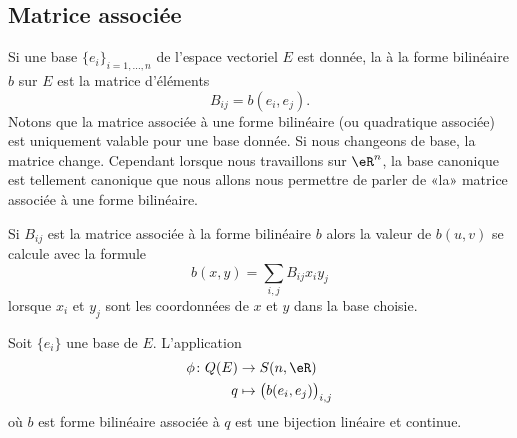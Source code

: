\subsection{Matrice associée}

Si une base \( \{ e_i \}_{i=1,\ldots, n}\) de l'espace vectoriel \( E\) est donnée, la  à la forme bilinéaire \( b\) sur \( E\) est la matrice d'éléments
\begin{equation}
    B_{ij}=b(e_i,e_j).
\end{equation}
Notons que la matrice associée à une forme bilinéaire (ou quadratique associée) est uniquement valable pour une base donnée. Si nous changeons de base, la matrice change. Cependant lorsque nous travaillons sur \( \eR^n\), la base canonique est tellement canonique que nous allons nous permettre de parler de «la» matrice associée à une forme bilinéaire. 

Si \( B_{ij}\) est la matrice associée à la forme bilinéaire \( b\) alors la valeur de \( b(u,v)\) se calcule avec la formule
\begin{equation}
    b(x,y)=\sum_{i,j}B_{ij}x_iy_j
\end{equation}
lorsque \( x_i\) et \( y_j\) sont les coordonnées de \( x\) et \( y\) dans la base choisie.

\begin{proposition} \label{PropFSXooRUMzdb}
    Soit \( \{ e_i \}\) une base de \( E\). L'application
    \begin{equation}
        \begin{aligned}
            \phi\colon Q(E)&\to S(n,\eR) \\
            q&\mapsto \big(   b(e_i,e_j)   \big)_{i,j}
        \end{aligned}
    \end{equation}
    où \( b\) est forme bilinéaire associée à \( q\) est une bijection linéaire et continue.
\end{proposition}

